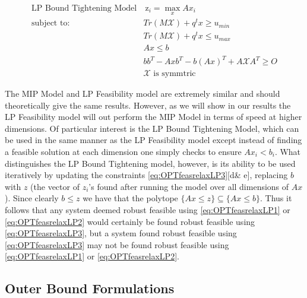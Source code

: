 \documentclass[11pt]{article}
\theoremstyle{plain}
\theoremstyle{definition}
\theoremstyle{remark}
\begin{document}
\begin{subequations}\label{eq:OPTfeasrelaxLP3}
\begin{align}
\text{LP Bound Tightening Model}& \ \mathrm{z}_{i} = \max_x Ax_i  \\
 \text{subject to: } \ &Tr\left(M\mathcal{X}\right)+q^tx \geq u_{min} \\
 & Tr\left(M\mathcal{X}\right)+q^tx \leq u_{max} \\
 	&Ax\leq b \\
 	&bb^T-Axb^T-b(Ax)^T+A\mathcal{X}A^T\geq O \\
 	&\mathcal{X} \text{ is symmtric}
\end{align}
\end{subequations}

The MIP Model and LP Feasibility model are extremely similar and should theoretically give the same results. However, as we will show in our results the LP Feasibility model will out perform the MIP Model in terms of speed at higher dimensions. Of particular interest is the LP Bound Tightening Model, which can be used in the same manner as the LP Feasibility model except instead of finding a feasible solution at each dimension one simply checks to ensure $Ax_i <b_i$. What distinguishes the LP Bound Tightening model, however, is its ability to be used iteratively by updating the constraints \eqref{eq:OPTfeasrelaxLP3}[d\& e], replacing $b$ with $z$ (the vector of $z_i$'s found after running the model over all dimensions of $Ax$). Since clearly $b\leq z$ we have that the polytope $\{Ax\leq z\}\subseteq\{Ax\leq b\}$. Thus it follows that any system deemed robust feasible using \eqref{eq:OPTfeasrelaxLP1} or \eqref{eq:OPTfeasrelaxLP2} would certainly be found robust feasible using \eqref{eq:OPTfeasrelaxLP3}, but a system found robust feasible using \eqref{eq:OPTfeasrelaxLP3} may not be found robust feasible using \eqref{eq:OPTfeasrelaxLP1} or \eqref{eq:OPTfeasrelaxLP2}. 


\subsection{Outer Bound Formulations}
\end{document}
